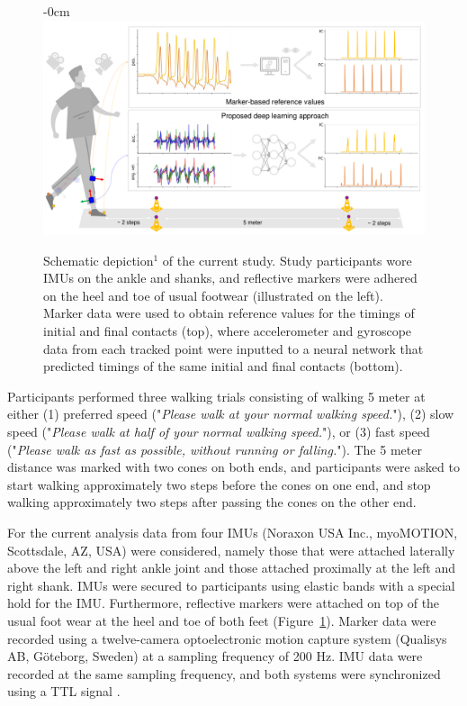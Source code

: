 \documentclass[sensors,article,submit,pdftex,moreauthors]{Definitions/mdpi}
\begin{document}
\begin{figure}[H]
	\begin{adjustwidth}{-\extralength}{0cm}
		\centering
		\includegraphics[width=13.5cm]{fig/methods_overall_workflow.pdf}
	\end{adjustwidth}
	\caption{Schematic depiction$^{1}$ of the current study. Study participants wore IMUs on the ankle and shanks, and reflective markers were adhered on the heel and toe of usual footwear (illustrated on the left). Marker data were used to obtain reference values for the timings of initial and final contacts (top), where accelerometer and gyroscope data from each tracked point were inputted to a neural network that predicted timings of the same initial and final contacts (bottom). \newline {} \label{fig:methods_marker_vs_imu}}
\end{figure}  

Participants performed three walking trials consisting of walking 5 meter at either (1) preferred speed ("\emph{Please walk at your normal walking speed.}"), (2) slow speed ("\emph{Please walk at half of your normal walking speed.}"), or (3) fast speed ("\emph{Please walk as fast as possible, without running or falling.}"). The 5 meter distance was marked with two cones on both ends, and participants were asked to start walking approximately two steps before the cones on one end, and stop walking approximately two steps after passing the cones on the other end.

For the current analysis data from four IMUs (Noraxon USA Inc., myoMOTION, Scottsdale, AZ, USA) were considered, namely those that were attached laterally above the left and right ankle joint and those attached proximally at the left and right shank. IMUs were secured to participants using elastic bands with a special hold for the IMU. Furthermore, reflective markers were attached on top of the usual foot wear at the heel and toe of both feet (Figure~\ref{fig:methods_marker_vs_imu}). Marker data were recorded using a twelve-camera optoelectronic motion capture system (Qualisys AB, G\"{o}teborg, Sweden) at a sampling frequency of 200 Hz. IMU data were recorded at the same sampling frequency, and both systems were synchronized using a TTL signal \cite{Warmerdam2021}.
\end{document}
